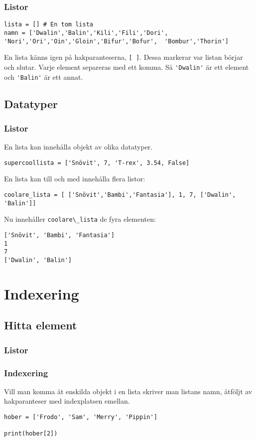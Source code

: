 \documentclass{beamer}
\newcommand{\code}[1]{\colorbox{white}{\lstinline{#1}}}
\begin{document}
\begin{frame}[fragile]
	\frametitle{Listor}
	
	\begin{lstlisting}
lista = [] # En tom lista
namn = ['Dwalin','Balin','Kili','Fili','Dori',  'Nori','Ori','Oin','Gloin','Bifur','Bofur',  'Bombur','Thorin']
	\end{lstlisting}
	
	En lista känns igen på hakparanteserna, \code{[ ]}. Dessa markerar var listan börjar och slutar. Varje element separeras med ett komma. Så \code{'Dwalin'} är ett element och \code{'Balin'} är ett annat.

\end{frame}

\subsection{Datatyper}

\begin{frame}[fragile]
\frametitle{Listor}

En lista kan innehålla objekt av olika datatyper.

\begin{lstlisting}
supercoollista = ['Snövit', 7, 'T-rex', 3.54, False]
\end{lstlisting}

En lista kan till och med innehålla flera listor:

\begin{lstlisting}
coolare_lista = [ ['Snövit','Bambi','Fantasia'], 1, 7, ['Dwalin', 'Balin']]
\end{lstlisting}

Nu innehåller \code{coolare\_lista} de fyra elementen:

\begin{lstlisting}
['Snövit', 'Bambi', 'Fantasia']
1
7
['Dwalin', 'Balin']
\end{lstlisting}

\end{frame}

\section{Indexering}

\subsection{Hitta element}

\begin{frame}[fragile]
	\frametitle{Listor}
	\frametitle{Indexering}

	Vill man komma åt enskilda objekt i en lista skriver man listans namn, åtföljt av hakparanteser med indexplatsen emellan.

	\begin{lstlisting}
hober = ['Frodo', 'Sam', 'Merry', 'Pippin']

print(hober[2])
	\end{lstlisting}

\end{frame}
\end{document}
